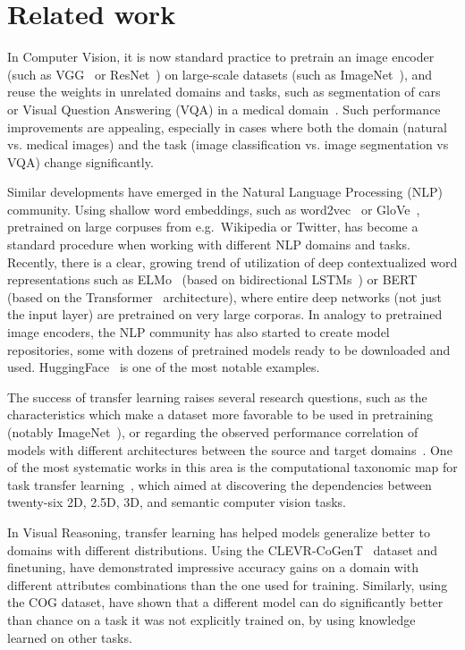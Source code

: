 \section{Related work}
\label{sec:related_work}

In Computer Vision, it is now standard practice to pretrain an image encoder (such as VGG~\cite{simonyan2014very} or ResNet~\cite{he2016deep}) on large-scale datasets (such as ImageNet~\cite{deng2009imagenet}), and reuse the weights in unrelated domains and tasks, such as segmentation of cars~\cite{iglovikov2018ternausnet} or Visual Question Answering (VQA) in a medical domain~\cite{kornuta2019leveraging}.
Such performance improvements are appealing, especially in cases where both the domain (natural vs. medical images) and the task (image classification vs. image segmentation vs VQA) change significantly.

Similar developments have emerged in the Natural Language Processing (NLP) community.
Using shallow word embeddings, such as word2vec~\cite{mikolov2013distributed} or GloVe~\cite{pennington2014glove}, pretrained on large corpuses from e.g.\ Wikipedia or Twitter, has become a standard procedure when working with different NLP domains and tasks.
Recently, there is a clear, growing trend of utilization of deep contextualized word representations such as ELMo~\cite{peters2018deep} (based on bidirectional LSTMs~\cite{hochreiter1997long}) or BERT~\cite{devlin2018bert} (based on the Transformer~\cite{vaswani2017attention} architecture), where entire deep networks (not just the input layer) are pretrained on very large corporas.
In analogy to pretrained image encoders, the NLP community has also started to create model repositories, some with dozens of pretrained models ready to be downloaded and used. HuggingFace~\cite{wolf2019transformers} is one of the most notable examples.

The success of transfer learning raises several research questions, such as the characteristics which make a dataset more favorable to be used in pretraining (notably ImageNet~\cite{huh2016makes}), or regarding the observed performance correlation of models with different architectures between the source and target domains~\cite{kornblith2019better}.
One of the most systematic works in this area is the computational taxonomic map for task transfer learning~\cite{zamir2018taskonomy}, which aimed at discovering the dependencies between twenty-six 2D, 2.5D, 3D, and semantic computer vision tasks.

In Visual Reasoning, transfer learning has helped models generalize better to domains with different distributions. Using the CLEVR-CoGenT~\cite{johnson2017clevr} dataset and finetuning, \cite{mascharka2018transparency, perez2018film, johnson2017inferring} have demonstrated impressive accuracy gains on a domain with different attributes combinations than the one used for training. Similarly, using the COG dataset, \cite{yang2018dataset} have shown that a different model can do significantly better than chance on a task it was not explicitly trained on, by using knowledge learned on other tasks.

